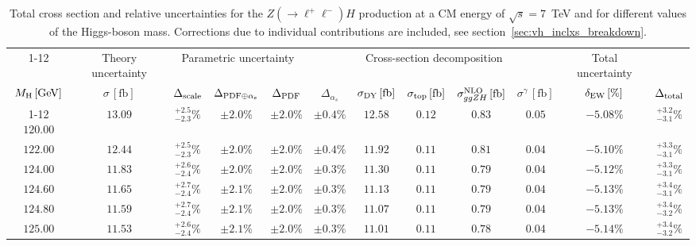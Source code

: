 \begin{landscape}
\begin{table}[ht!]
\caption{Total cross section and relative uncertainties for the $Z ( \rightarrow \ell^+ \ell^-) H$ production at a CM energy of  $\sqrt{s}=7$~TeV and for different values of the Higgs-boson mass. Corrections due to individual contributions are included, see section~\ref{sec:vh_inclxs_breakdown}.}
\label{tab:zh_lep_xs_7tev}
\centering
\scriptsize
{\renewcommand{\arraystretch}{1.4}
\begin{tabular}{| cc | c | ccc | ccccc | c |}
\cline{1-12}
\multicolumn{2}{|c|}{\(\sqrt{s} = 7\,\mathrm{TeV}\)} &
\multicolumn{1}{|c|}{Theory uncertainty} &
\multicolumn{3}{|c|}{Parametric uncertainty} &
\multicolumn{5}{|c|}{Cross-section decomposition} &
\multicolumn{1}{c|}{Total uncertainty} \\
\(M_\mathrm{H}\,[\mathrm{GeV}]\) & \(\sigma\,[\mathrm{fb}]\) &
\(\Delta_{\rm scale}\) &
\(\Delta_{\rm PDF\oplus\alpha_s}\) &
{\color{black!55}\(\Delta_{\rm PDF}\)} & {\color{black!55}\(\Delta_{\alpha_s}\)} &
\(\sigma_{\rm DY}\,[\mathrm{fb}]\) & \(\sigma_{\rm top}\,[\mathrm{fb}]\) & \(\sigma^{\rm NLO}_{ggZH}\,[\mathrm{fb}]\) & \(\sigma^\gamma\,[\mathrm{fb}]\) & \(\delta_{\rm EW}\,[\%]\) &
\(\Delta_{\rm total}\)
\\
\cline{1-12}
$120.00$ & $13.09$ & $^{+2.5}_{-2.3}\%$ & $\pm 2.0\%$ & {\color{black!55}$\pm 2.0\%$} & {\color{black!55}$\pm 0.4\%$} & $12.58$ & $0.12$ & $0.83$ & $0.05$ & $-5.08\%$ & $^{+3.2}_{-3.1}\%$ \\
$122.00$ & $12.44$ & $^{+2.5}_{-2.3}\%$ & $\pm 2.0\%$ & {\color{black!55}$\pm 2.0\%$} & {\color{black!55}$\pm 0.4\%$} & $11.92$ & $0.11$ & $0.81$ & $0.04$ & $-5.10\%$ & $^{+3.3}_{-3.1}\%$ \\
$124.00$ & $11.83$ & $^{+2.6}_{-2.4}\%$ & $\pm 2.0\%$ & {\color{black!55}$\pm 2.0\%$} & {\color{black!55}$\pm 0.3\%$} & $11.30$ & $0.11$ & $0.79$ & $0.04$ & $-5.12\%$ & $^{+3.3}_{-3.1}\%$ \\
$124.60$ & $11.65$ & $^{+2.7}_{-2.4}\%$ & $\pm 2.1\%$ & {\color{black!55}$\pm 2.0\%$} & {\color{black!55}$\pm 0.3\%$} & $11.13$ & $0.11$ & $0.79$ & $0.04$ & $-5.13\%$ & $^{+3.4}_{-3.1}\%$ \\
$124.80$ & $11.59$ & $^{+2.7}_{-2.4}\%$ & $\pm 2.1\%$ & {\color{black!55}$\pm 2.0\%$} & {\color{black!55}$\pm 0.3\%$} & $11.07$ & $0.11$ & $0.79$ & $0.04$ & $-5.13\%$ & $^{+3.4}_{-3.2}\%$ \\
$125.00$ & $11.53$ & $^{+2.6}_{-2.4}\%$ & $\pm 2.1\%$ & {\color{black!55}$\pm 2.0\%$} & {\color{black!55}$\pm 0.3\%$} & $11.01$ & $0.11$ & $0.78$ & $0.04$ & $-5.14\%$ & $^{+3.4}_{-3.2}\%$ \\

\end{tabular}}
\end{table}
\end{landscape}
